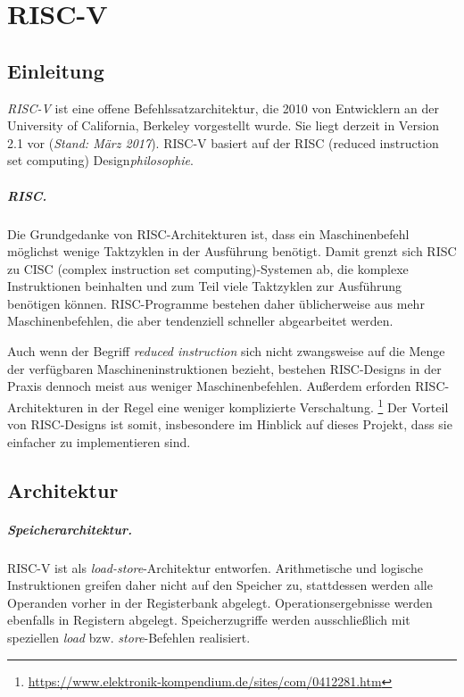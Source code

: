\chapter{RISC-V} %
\label{RISC-V} %

\section{Einleitung}
\emph{RISC-V} ist eine offene Befehlssatzarchitektur, die 2010 von Entwicklern an der University of California, Berkeley vorgestellt wurde. Sie liegt derzeit in Version 2.1 vor (\textit{Stand: März 2017}). RISC-V basiert auf der RISC (reduced instruction set computing) Design\textit{philosophie}.

\paragraph{RISC.} Die Grundgedanke von RISC-Architekturen ist, dass ein Maschinenbefehl möglichst wenige Taktzyklen in der Ausführung benötigt. Damit grenzt sich RISC zu CISC (complex instruction set computing)-Systemen ab, die komplexe Instruktionen beinhalten und zum Teil viele Taktzyklen zur Ausführung benötigen können. RISC-Programme bestehen daher üblicherweise aus mehr Maschinenbefehlen, die aber tendenziell schneller abgearbeitet werden.

Auch wenn der Begriff \textit{reduced instruction} sich nicht zwangsweise auf die Menge der verfügbaren Maschineninstruktionen bezieht, bestehen RISC-Designs in der Praxis dennoch meist aus weniger Maschinenbefehlen. Außerdem erforden RISC-Architekturen in der Regel eine weniger komplizierte Verschaltung. \footnote{\url{https://www.elektronik-kompendium.de/sites/com/0412281.htm}} Der Vorteil von RISC-Designs ist somit, insbesondere im Hinblick auf dieses Projekt, dass sie einfacher zu implementieren sind.

\section{Architektur}
\label{subsec:Register}

\paragraph{Speicherarchitektur.} RISC-V ist als \textit{load-store}-Architektur entworfen. Arithmetische und logische Instruktionen greifen daher nicht auf den Speicher zu, stattdessen werden alle Operanden vorher in der Registerbank abgelegt. Operationsergebnisse werden ebenfalls in Registern abgelegt. Speicherzugriffe werden ausschließlich mit speziellen \textit{load} bzw. \textit{store}-Befehlen realisiert.

